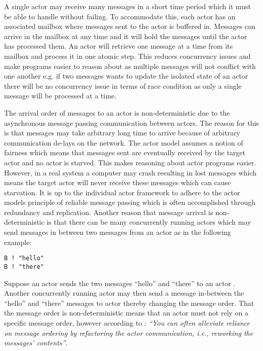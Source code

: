 A single actor may receive many messages in a short time period which it must be able to handle without failing. To accommodate this, each actor has an associated mailbox where messages sent to the actor is buffered in\cite[Chap. 2.6]{haller2012actors}. Messages can arrive in the mailbox at any time and it will hold the messages until the actor has processed them. An actor will retrieve one message at a time from its mailbox and process it in one atomic step\cite[p. 2]{karmani2009actor}. This reduces concurrency issues and make programs easier to reason about as multiple messages will not conflict with one another e.g. if two messages wants to update the isolated state of an actor there will be no concurrency issue in terms of race condition as only a single message will be processed at a time.

The arrival order of messages to an actor is non-deterministic due to the asynchronous message passing communication between actors\cite[p. 2]{karmani2011actors}. The reason for this is that messages may take arbitrary long time to arrive because of arbitrary communication de-lays on the network. The actor model assumes a notion of fairness which means that messages sent are eventually received by the target actor and no actor is starved\cite[Chap. 2.5]{haller2012actors}\cite[p. 3]{karmani2009actor}. This makes reasoning about actor programs easier\cite{tasharofi2013scala}. However, in a real system a computer may crash resulting in lost messages which means the target actor will never receive these messages which can cause starvation. It is up to the individual actor framework to adhere to the actor models principle of reliable message passing which is often accomplished through redundancy and replication\cite[Chap. 2.5]{haller2012actors}. Another reason that message arrival is non-deterministic is that there can be many concurrently running actors which may send messages in between two messages from an actor as in the following example:
\begin{verbatim}
B ! "hello"
B ! "there"
\end{verbatim}
Suppose an actor  sends the two messages ``hello'' and ``there'' to an actor . Another concurrently running actor  may then send a message in-between the ``hello'' and ``there'' messages to actor  thereby changing the message order. That the message order is non-deterministic means that an actor must not rely on a specific message order, however according to \cite[p. 35]{haller2012actors}: \textit{``You can often alleviate reliance on message ordering by refactoring the actor communication, i.e., reworking the messages' contents''}.

